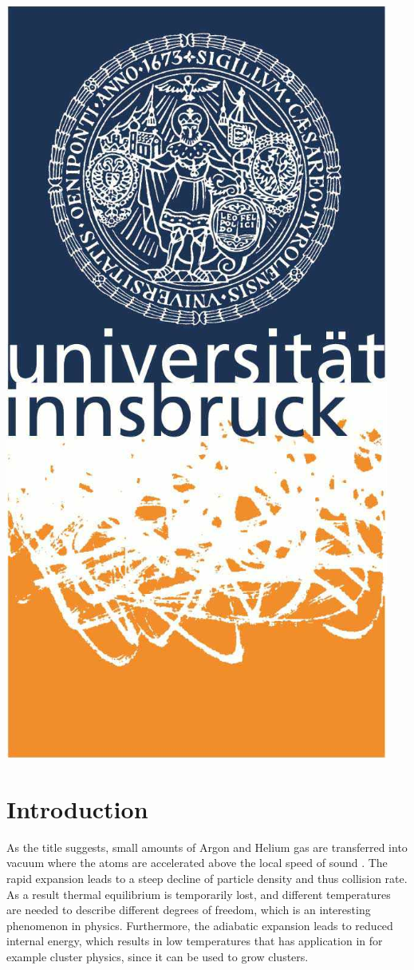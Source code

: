 \documentclass[a4paper,10pt]{article}
\begin{document}
\begin{titlepage}
	\begin{center}
	\includegraphics[scale=0.4]{img/uibk}
	\end{center}

\end{titlepage}

\section{Introduction}
As the title suggests, small amounts of Argon and Helium gas are transferred into vacuum where the atoms are accelerated above the local speed of sound \cite{illinois}. The rapid expansion leads to a steep decline of particle density and thus collision rate. As a result thermal equilibrium is temporarily lost, and different temperatures are needed to describe different degrees of freedom, which is an interesting phenomenon in physics. Furthermore, the adiabatic expansion leads to reduced internal energy, which results in low temperatures that has application in for example cluster physics, since it can be used to grow clusters.
\end{document}
